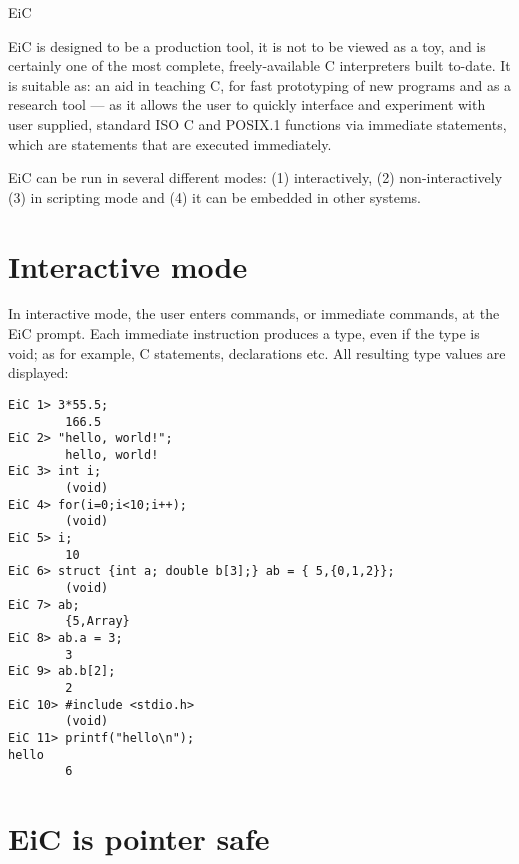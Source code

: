 \documentclass[12pt]{report}
\begin{document}
\huge
{\bf \centerline{ EiC}}
\normalsize

\tableofcontents

\vspace{0.5 cm}


EiC is designed to be a production tool, it is not to be viewed as a
toy, and is certainly one of the most complete, freely-available C
interpreters built to-date. It is suitable as: an aid in teaching C,
for fast prototyping of new programs and as a research tool --- as it
allows the user to quickly interface and experiment with user
supplied, standard ISO C and POSIX.1 functions via immediate
statements, which are statements that are executed immediately.
 

EiC can be run in several different modes: (1) interactively, (2)
non-interactively (3) in scripting mode and (4) it can be
embedded in other systems.

\section{ Interactive mode}

In interactive mode, the user enters commands, or immediate commands,
at the EiC prompt. Each immediate instruction produces a type, even if
the type is void; as for example, C statements, declarations etc. All
resulting type values are displayed:

\begin{production}
\begin{verbatim}
EiC 1> 3*55.5;
        166.5
EiC 2> "hello, world!";
        hello, world!
EiC 3> int i;
        (void)
EiC 4> for(i=0;i<10;i++);
        (void)
EiC 5> i;
        10
EiC 6> struct {int a; double b[3];} ab = { 5,{0,1,2}};
        (void)
EiC 7> ab;
        {5,Array}
EiC 8> ab.a = 3;
        3
EiC 9> ab.b[2];
        2
EiC 10> #include <stdio.h>
        (void)
EiC 11> printf("hello\n");
hello
        6
\end{verbatim}
\end{production}

\section{EiC is pointer safe}
\end{document}
